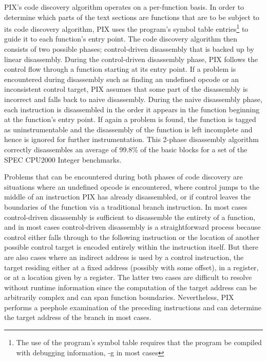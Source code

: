 PIX's code discovery algorithm operates on a per-function basis.
In order to determine which parts of the text sections are functions that are to be subject to its code discovery algorithm, 
PIX uses the program's symbol table entries\footnote{The use of the program's symbol table requires that the program be compiled
with debugging information, -g in most cases} to guide it to each function's entry point. The code discovery algorithm then
consists of two possible phases; control-driven disassembly that is backed up by linear disassembly. During the control-driven disassembly phase, 
PIX follows the control flow through a function starting at its entry point. If a problem is encountered during disassembly such as 
finding an undefined opcode or an inconsistent control target, 
PIX assumes that some part of the disassembly is incorrect and falls back to naive 
disassembly. During the naive disassembly phase, each instruction is disassembled in the order it appears in the
function beginning at the function's entry point. If again a problem 
is found, the function is tagged as uninstrumentable and the disassembly of the function is left incomplete and
hence is ignored for further instrumentation. This 2-phase disassembly algorithm correctly disassembles
an average of 99.8\% of the basic blocks for a set of the SPEC CPU2000 Integer benchmarks.

Problems that can be encountered during both phases of code discovery
are situations where an undefined opcode is encountered, where control jumps to the
middle of an instruction PIX has already disassembled, or if control leaves the boundaries of the function via a traditional branch
instruction. In most
cases control-driven disassembly is sufficient to disassemble the entirety of a function, and in most cases control-driven
disassembly is a straightforward process because control either falls through to the following instruction 
or the location of another possible control target is encoded entirely within the instruction itself. But there are also cases
where an indirect address is used by a control instruction, the target residing either at a fixed address (possibly with some offset), in a register, 
or at a location given by a register. The latter two cases are difficult to resolve
without runtime information since the computation of the target address can be arbitrarily complex and can span function
boundaries. Nevertheless, PIX performs a peephole examination of the preceding instructions and can determine 
the target address of the branch in most cases.

